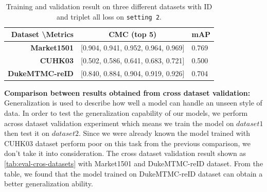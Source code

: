 \begin{table}[]
    \centering
    \begin{tabular}{|r|l|l|}
        \hline
        \textbf{Dataset \textbackslash Metrics} &
        \multicolumn{1}{c|}{\textbf{CMC (top 5)}} &
        \multicolumn{1}{c|}{\textbf{mAP}} \\ \hline
        \textbf{Market1501} & {[}0.904, 0.941, 0.952, 0.964, 0.969{]} & 0.769
        \\ \hline
        \textbf{CUHK03} & {[}0.502, 0.586, 0.641, 0.683, 0.721{]} & 0.500 \\
        \hline
        \textbf{DukeMTMC-reID} & {[}0.840, 0.884, 0.904, 0.919, 0.926{]} &
        0.704 \\ \hline
    \end{tabular}
    \caption{Training and validation result on three different datasets with ID
        and triplet all loss on \texttt{setting 2}.}
    \label{tab:eval-dif-datasets}
\end{table}

\textbf{Comparison between results obtained from cross dataset validation:}
Generalization is used to describe how well a model can handle an unseen style
of data. In order to test the generalization capability of our models, we
perform across dataset validation experiment which means we train the model on
$dataset1$ then test it on $dataset2$. Since we were already known the model
trained with CUHK03 dataset perform poor on this task from the previous
comparison, we don't take it into consideration. The cross dataset validation
result shown as \autoref{tab:eval-cros-datasets} with Market1501 and
DukeMTMC-reID dataset.
From the table, we found that the model trained on DukeMTMC-reID dataset can
obtain a better generalization ability.

\begin{table}[]
    \caption[Cross dataset validation result between Market1501 and
    DukeMTMC-reID dataset on \texttt{setting 2}]
    {Cross dataset validation result between Market1501 and DukeMTMC-reID
        dataset on \texttt{setting 2}. M $\rightarrow$ D represents the model
        trained on Market1501 dataset and tested on DukeMTMC-reID dataset.}
    \label{tab:eval-cros-datasets}
\end{table}

